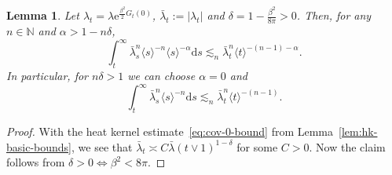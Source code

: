 \documentclass[11pt, a4paper]{scrartcl}
\numberwithin{equation}{section}
\theoremstyle{plain}
\newtheorem{lemma}[foo]{Lemma}
\theoremstyle{remark}
\newcommand{\mathd}{\mathrm{d}}
\newcommand{\mathe}{\mathrm{e}}
\begin{document}
\begin{lemma}
	\label{lem:lambda-integrability}Let $\lambda_t = \lambda
		\mathe^{\frac{\beta^{2}}{2} G_t (0)}$, $\bar{\lambda}_t:=|\lambda_t|$ and $\delta = 1 - \frac{\beta^2}{8 \pi} >
		0$. Then, for any $n \in \mathbb{N}$ and $\alpha > 1 - n \delta$,
	\begin{equation}
		\int_t^{\infty} \bar{\lambda}_s^n \langle s \rangle^{- n} \langle s \rangle^{-
			\alpha} \mathd s \lesssim_n \bar{\lambda}_t^n \langle t \rangle^{- (n - 1) -
			\alpha} . \label{eq:int-alpha}
	\end{equation}
	In particular, for $n \delta > 1$ we can choose $\alpha = 0$ and
	\begin{equation}
		\int_t^{\infty} \bar{\lambda}_s^n \langle s \rangle^{- n} \mathd s \lesssim_n
		\bar{\lambda}_t^n \langle t \rangle^{- (n - 1)} . \label{eq:int-rem}
	\end{equation}
\end{lemma}

\begin{proof}
	With the heat kernel estimate~\eqref{eq:cov-0-bound} from
	Lemma~\ref{lem:hk-basic-bounds}, we see that $\bar{\lambda}_t \asymp  C \bar{\lambda} (t \vee
		1)^{1 - \delta}$ for some $C > 0$. Now the claim follows from $\delta > 0
		\Leftrightarrow \beta^2 < 8 \pi$.
\end{proof}
\end{document}
